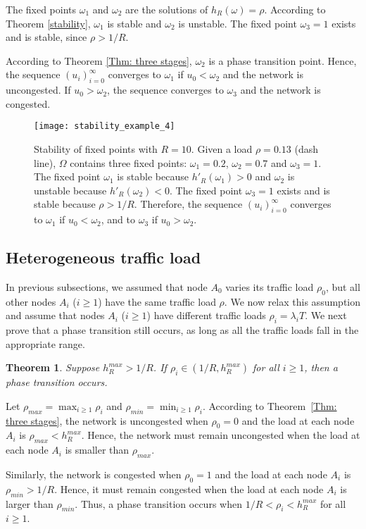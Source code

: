 \documentclass{IEEEtran}
\newtheorem{theorem}{Theorem}
\begin{document}
The fixed points $\omega_1$ and $\omega_2$ are the solutions of $h_R(\omega) = \rho$. According to Theorem \ref{stability}, $\omega_1$ is stable and
$\omega_2$ is unstable. The fixed point $\omega_3=1$ exists and is stable, since $\rho > 1/R$.

According to Theorem \ref{Thm: three stages}, $\omega_2$ is a phase transition point. Hence, the sequence $(u_i)_{i=0}^{\infty}$ converges to
$\omega_1$ if $u_0 < \omega_2$ and the network is uncongested. If $u_0 > \omega_2$, the sequence converges to $\omega_3$ and the network is
congested.

\begin{figure}[!t]
\centering
\texttt{[image: stability\_example\_4]}
\caption{Stability of fixed points with $R=10$. Given a load $\rho = 0.13$ (dash line), $\Omega$ contains three fixed points: $\omega_1 = 0.2$,
$\omega_2 = 0.7$ and $\omega_3=1$. The fixed point $\omega_1$ is stable because $h'_R(\omega_1) > 0$ and $\omega_2$ is unstable because
$h'_R(\omega_2) < 0$. The fixed point $\omega_3=1$ exists and is stable because $\rho > 1/R$. Therefore, the sequence $(u_i)_{i=0}^{\infty}$
converges to $\omega_1$ if $u_0 < \omega_2$, and to $\omega_3$ if $u_0 > \omega_2$.}
\label{stability example}
\end{figure}

\subsection{Heterogeneous traffic load}
\label{sec:heter}
In previous subsections, we assumed that node $A_0$ varies its traffic load
$\rho_0$, but all other nodes $A_i$ ($i \geq 1$) have the same traffic load $\rho$.
We now relax this assumption and assume that nodes $A_i$ ($i \geq 1$) have different traffic loads
$\rho_i = \lambda_i T$.
We next prove that a phase transition still occurs, as long as all the traffic loads fall in the appropriate range.



\begin{theorem}
Suppose $h^{max}_R > 1/R$. If  $\rho_i \in (1/R, h^{max}_R)$ for all $i  \geq 1$, then a phase transition occurs.
\end{theorem}
\begin{IEEEproof}
Let $\rho_{max} = \max_{i \geq 1} \rho_i$ and $\rho_{min} = \min_{i \geq 1} \rho_i$.
According to Theorem~\ref{Thm: three stages}, the network is uncongested when $\rho_0=0$ and the load at each node $A_i$ is $\rho_{max} <
h_R^{max}$.
Hence, the network must remain uncongested when the load at each node $A_i$ is smaller than $\rho_{max}$.

Similarly, the network is congested when $\rho_0=1$ and the load at each node $A_i$ is $\rho_{min} > 1/R$.
Hence, it must remain congested when the load at each node $A_i$ is larger than $\rho_{min}$.
Thus, a phase transition occurs when $1/R < \rho_i < h_R^{max}$ for all $i  \geq  1$.
\end{IEEEproof}
\end{document}
